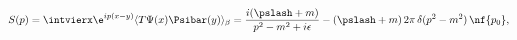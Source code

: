 \begin{equation}
  S(p)=\intvierx \e^{ip(x-y)}\langle T \Psi(x)\Psibar(y)\rangle_\beta=
  \frac{i(\pslash+m)}{p^2-m^2+i\epsilon}
  -(\pslash+m)\,2\pi\,\delta(p^2-m^2)\,\nf{p_0},
\end{equation}

